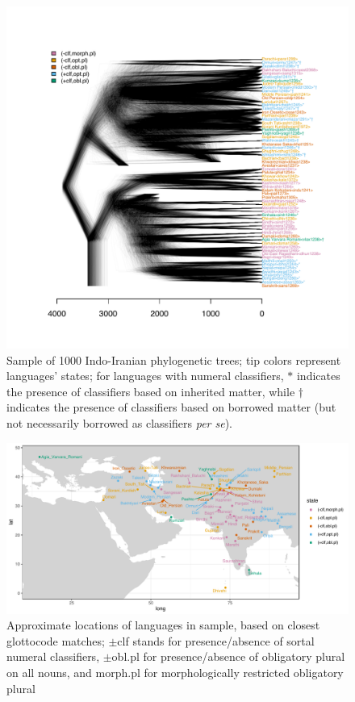\documentclass[11pt]{article}
\begin{document}
\begin{figure}
\centering
\includegraphics[width=\linewidth]{code/tree_sample.pdf}
\caption{Sample of 1000 Indo-Iranian phylogenetic trees; tip colors represent languages' states; for languages with numeral classifiers, $*$ indicates the presence of classifiers based on inherited matter, while $\dagger$ indicates the presence of classifiers based on borrowed matter (but not necessarily borrowed as classifiers {\it per se}).}
\end{figure}


\begin{figure}
\centering
%
\includegraphics[width=.95\linewidth]{code/lang_map.pdf}
\caption{Approximate locations of languages in sample, based on closest glottocode matches; {\sc $\pm$clf} stands for presence/absence of sortal numeral classifiers, {\sc $\pm$obl.pl} for presence/absence of obligatory plural on all nouns, and {\sc morph.pl} for morphologically restricted obligatory plural}
\label{map}
\end{figure}
\end{document}
